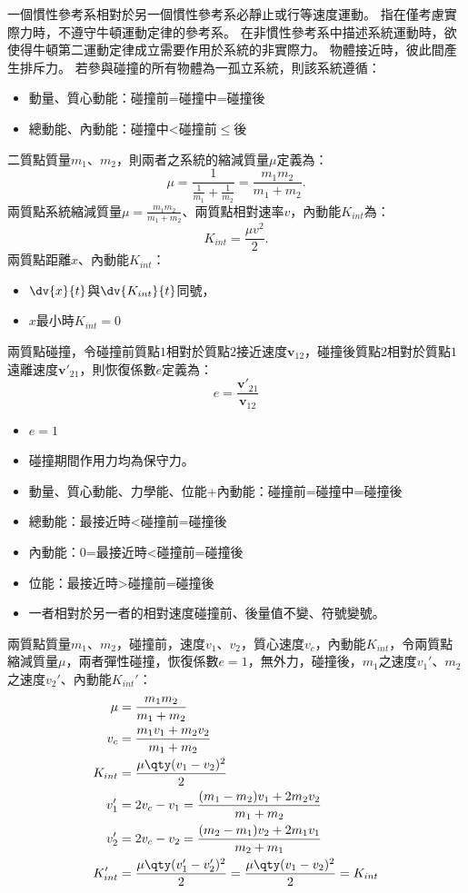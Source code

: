 \documentclass[a4paper,12pt]{article}
\begin{document}
一個慣性參考系相對於另一個慣性參考系必靜止或行等速度運動。
指在僅考慮實際力時，不遵守牛頓運動定律的參考系。
在非慣性參考系中描述系統運動時，欲使得牛頓第二運動定律成立需要作用於系統的非實際力。
物體接近時，彼此間產生排斥力。
若參與碰撞的所有物體為一孤立系統，則該系統遵循：
\begin{itemize}
\item 動量、質心動能：碰撞前=碰撞中=碰撞後
\item 總動能、內動能：碰撞中<碰撞前$\leq$後
\end{itemize}
二質點質量$m_1$、$m_2$，則兩者之系統的縮減質量$\mu$定義為：
\[\mu=\frac{1}{\frac{1}{m_1}+\frac{1}{m_2}} = \frac{m_1m_2}{m_1+m_2}.\]
兩質點系統縮減質量$\mu=\frac{m_1m_2}{m_1+m_2}$、兩質點相對速率$v$，內動能$K_{int}$為：
\[K_{int}= \frac{\mu v^2}{2}.\]
兩質點距離$x$、內動能$K_{int}$：
\begin{itemize}
\item $\dv{x}{t}$與$\dv{K_{int}}{t}$同號，
\item $x$最小時$K_{int}=0$
\end{itemize}
兩質點碰撞，令碰撞前質點$1$相對於質點$2$接近速度$\mathbf{v}_{12}$，碰撞後質點$2$相對於質點$1$遠離速度$\mathbf{v}'_{21}$，則恢復係數$e$定義為：
\[e = \frac{\mathbf{v}'_{21}}{\mathbf{v}_{12}} \]
\begin{itemize}
\item $e=1$
\item 碰撞期間作用力均為保守力。
\item 動量、質心動能、力學能、位能+內動能：碰撞前=碰撞中=碰撞後
\item 總動能：最接近時<碰撞前=碰撞後
\item 內動能：0=最接近時<碰撞前=碰撞後
\item 位能：最接近時>碰撞前=碰撞後
\item 一者相對於另一者的相對速度碰撞前、後量值不變、符號變號。
\end{itemize}
兩質點質量$m_1$、$m_2$，碰撞前，速度$v_1$、$v_2$，質心速度$v_c$，內動能$K_{int}$，令兩質點縮減質量$\mu$，兩者彈性碰撞，恢復係數$e=1$，無外力，碰撞後，$m_1$之速度$v_1'$、$m_2$之速度$v_2'$、內動能$K_{int}'$：
\[\begin{aligned}
\mu&=\frac{m_1m_2}{m_1+m_2}\\
v_c &= \frac{m_1v_1+m_2v_2}{m_1+m_2} \\
K_{int} &= \frac{\mu\qty(v_1-v_2)^2}{2}\\
v_1' &= 2v_c - v_1 = \frac{(m_1-m_2)v_1+2m_2v_2}{m_1+m_2} \\
v_2' &= 2v_c - v_2 = \frac{(m_2-m_1)v_2+2m_1v_1}{m_2+m_1} \\
K_{int}' &= \frac{\mu \qty(v_1'-v_2')^2}{2} = \frac{\mu \qty(v_1-v_2)^2}{2} = K_{int}
\end{aligned}\]
\end{document}
